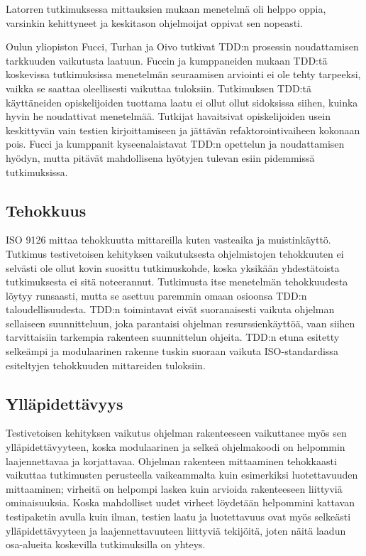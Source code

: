 \documentclass[finnish]{tktltiki2}
\theoremstyle{definition}
\theoremstyle{remark}
\begin{document}
Latorren \cite{Latorre14} tutkimuksessa mittauksien mukaan menetelmä oli helppo oppia, varsinkin kehittyneet ja keskitason ohjelmoijat oppivat sen nopeasti.

Oulun yliopiston Fucci, Turhan ja Oivo \cite{Fucci14} tutkivat TDD:n prosessin noudattamisen tarkkuuden vaikutusta laatuun. Fuccin ja kumppaneiden mukaan TDD:tä koskevissa tutkimuksissa menetelmän seuraamisen arviointi ei ole tehty tarpeeksi, vaikka se saattaa oleellisesti vaikuttaa tuloksiin. Tutkimuksen TDD:tä käyttäneiden opiskelijoiden tuottama laatu ei ollut ollut sidoksissa siihen, kuinka hyvin he noudattivat menetelmää. Tutkijat havaitsivat opiskelijoiden usein keskittyvän vain testien kirjoittamiseen ja jättävän refaktorointivaiheen kokonaan pois. Fucci ja kumppanit kyseenalaistavat TDD:n opettelun ja noudattamisen hyödyn, mutta pitävät mahdollisena hyötyjen tulevan esiin pidemmissä tutkimuksissa.

\subsection{Tehokkuus}

ISO 9126 mittaa tehokkuutta mittareilla kuten vasteaika ja muistinkäyttö. Tutkimus testivetoisen kehityksen vaikutuksesta ohjelmistojen tehokkuuten ei selvästi ole ollut kovin suosittu tutkimuskohde, koska yksikään yhdestätoista tutkimuksesta ei sitä noteerannut. Tutkimusta itse menetelmän tehokkuudesta löytyy runsaasti, mutta se asettuu paremmin omaan osioonsa TDD:n taloudellisuudesta. TDD:n toimintavat eivät suoranaisesti vaikuta ohjelman sellaiseen suunnitteluun, joka parantaisi ohjelman resurssienkäyttöä, vaan siihen tarvittaisiin tarkempia rakenteen suunnittelun ohjeita. TDD:n etuna esitetty selkeämpi ja modulaarinen rakenne tuskin suoraan vaikuta ISO-standardissa esiteltyjen tehokkuuden mittareiden tuloksiin.

\subsection{Ylläpidettävyys}

Testivetoisen kehityksen vaikutus ohjelman rakenteeseen vaikuttanee myös sen ylläpidettävyyteen, koska modulaarinen ja selkeä ohjelmakoodi on helpommin laajennettavaa ja korjattavaa. Ohjelman rakenteen mittaaminen tehokkaasti vaikuttaa tutkimusten perusteella vaikeammalta kuin esimerkiksi luotettavuuden mittaaminen; virheitä on helpompi laskea kuin arvioida rakenteeseen liittyviä ominaisuuksia. Koska mahdolliset uudet virheet löydetään helpommini kattavan testipaketin avulla kuin ilman, testien laatu ja luotettavuus ovat myös selkeästi ylläpidettävyyteen ja laajennettavuuteen liittyviä tekijöitä, joten näitä laadun osa-alueita koskevilla tutkimuksilla on yhteys.
\end{document}

